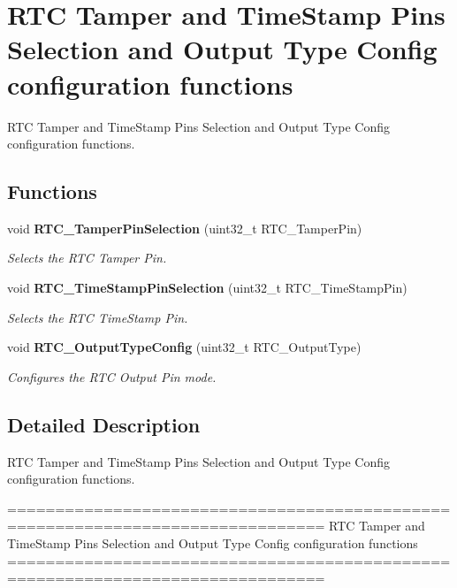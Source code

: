 \section{R\+TC Tamper and Time\+Stamp Pins Selection and Output Type Config configuration functions}
\label{group__RTC__Group11}


R\+TC Tamper and Time\+Stamp Pins Selection and Output Type Config configuration functions.  


\subsection*{Functions}
\begin{DoxyCompactItemize}
\item 
void \textbf{ R\+T\+C\+\_\+\+Tamper\+Pin\+Selection} (uint32\+\_\+t R\+T\+C\+\_\+\+Tamper\+Pin)
\begin{DoxyCompactList}\small\item\em Selects the R\+TC Tamper Pin. \end{DoxyCompactList}\item 
void \textbf{ R\+T\+C\+\_\+\+Time\+Stamp\+Pin\+Selection} (uint32\+\_\+t R\+T\+C\+\_\+\+Time\+Stamp\+Pin)
\begin{DoxyCompactList}\small\item\em Selects the R\+TC Time\+Stamp Pin. \end{DoxyCompactList}\item 
void \textbf{ R\+T\+C\+\_\+\+Output\+Type\+Config} (uint32\+\_\+t R\+T\+C\+\_\+\+Output\+Type)
\begin{DoxyCompactList}\small\item\em Configures the R\+TC Output Pin mode. \end{DoxyCompactList}\end{DoxyCompactItemize}


\subsection{Detailed Description}
R\+TC Tamper and Time\+Stamp Pins Selection and Output Type Config configuration functions. 

\begin{DoxyVerb} ===============================================================================
  RTC Tamper and TimeStamp Pins Selection and Output Type Config configuration 
  functions 
 ===============================================================================  \end{DoxyVerb}
 

